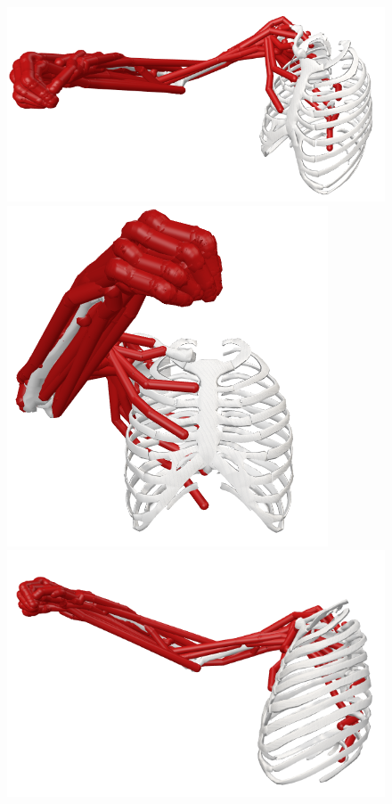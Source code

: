 \begin{figure}[!htb]
    \centering
    \captionsetup{justification=centering}
    \begin{minipage}{0.3\linewidth}
        \centering
        \includegraphics[trim={10 10 10 10}, clip, width=1\linewidth]{img/chapter_4/pose_2_view.png}
    \end{minipage}
    \hfill
    \begin{minipage}{0.3\linewidth}
        \captionsetup{justification=centering}
        \centering
        \includegraphics[trim={0 0 0 0}, clip, width=0.7\linewidth]{img/chapter_4/pose_2_front.png}
    \end{minipage}
    \hfill
    \begin{minipage}{0.3\linewidth}
        \captionsetup{justification=centering}
        \centering
        \includegraphics[trim={0 0 0 0}, clip, width=1\linewidth]{img/chapter_4/pose_2_side.png}

\end{minipage}
\end{figure}
